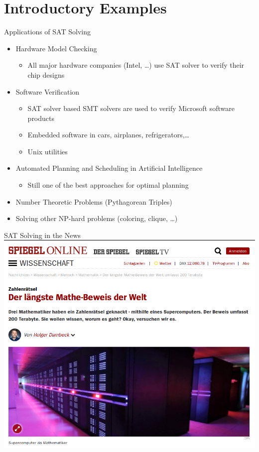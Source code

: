 \documentclass[t]{sdqbeamer}
\begin{document}
\section{Introductory Examples}

\begin{frame}{Applications of SAT Solving}
\begin{itemize}
	\item Hardware Model Checking
	\begin{itemize}
	\item All major hardware companies (Intel, \dots) use SAT solver to verify their chip designs
	\end{itemize}
	\item Software Verification
	\begin{itemize}
	\item SAT solver based SMT solvers are used to verify Microsoft software products
	\item Embedded software in cars, airplanes, refrigerators,\dots
	\item Unix utilities
	\end{itemize}
	\item Automated Planning and Scheduling in Artificial Intelligence
	\begin{itemize}
	\item Still one of the best approaches for optimal planning
	\end{itemize}
	\item Number Theoretic Problems (Pythagorean Triples)
	\item Solving other NP-hard problems (coloring, clique, \dots)
\end{itemize}
\end{frame}

\begin{frame}{SAT Solving in the News}
	\centering
	\includegraphics[height=.75\textheight]{figures/l01/triples-spiegel.png}
\end{frame}
\end{document}
